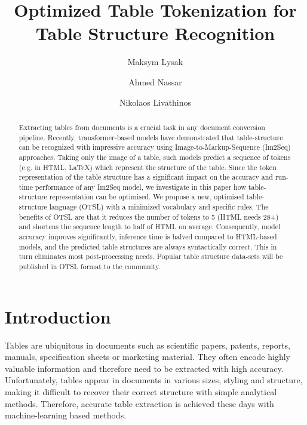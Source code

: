\documentclass[runningheads]{llncs}
\begin{document}
\title{Optimized Table Tokenization for Table Structure Recognition}

\author{Maksym Lysak  \and
Ahmed Nassar \and
Nikolaos Livathinos \and
{} \and
{}}

%
%
\maketitle              %
%
\begin{abstract}

Extracting tables from documents is a crucial task in any document conversion pipeline. Recently, transformer-based models have demonstrated that table-structure can be recognized with impressive accuracy using Image-to-Markup-Sequence (Im2Seq) approaches. Taking only the image of a table, such models predict a sequence of tokens (e.g. in HTML, LaTeX) which represent the structure of the table. Since the token representation of the table structure has a significant impact on the accuracy and run-time performance of any Im2Seq model, we investigate in this paper how table-structure representation can be optimised. We propose a new, optimised table-structure language (OTSL) with a minimized vocabulary and specific rules. The benefits of OTSL are that it reduces the number of tokens to 5 (HTML needs 28+) and shortens the sequence length to half of HTML on average. Consequently, model accuracy improves significantly, inference time is halved compared to HTML-based models, and the predicted table structures are always syntactically correct. This in turn eliminates most post-processing needs. Popular table structure data-sets will be published in OTSL format to the community.

\end{abstract}

\section{Introduction}
Tables are ubiquitous in documents such as scientific papers, patents, reports, manuals, specification sheets or marketing material. They often encode highly valuable information and therefore need to be extracted with high accuracy. Unfortunately, tables appear in documents in various sizes, styling and structure, making it difficult to recover their correct structure with simple analytical methods. Therefore, accurate table extraction is achieved these days with machine-learning based methods.
\end{document}
